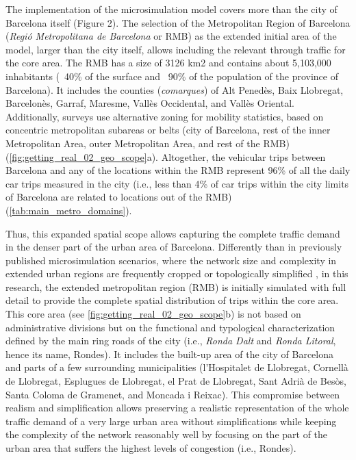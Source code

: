The implementation of the microsimulation model covers more than the city of Barcelona itself (Figure 2). The selection of the Metropolitan Region of Barcelona (\emph{Regió Metropolitana de Barcelona} or RMB) as the extended initial area of the model, larger than the city itself, allows including the relevant through traffic for the core area. The RMB has a size of 3126 km2 and contains about 5,103,000 inhabitants (~40\% of the surface and ~90\% of the population of the province of Barcelona). It includes the counties (\emph{comarques}) of Alt Penedès, Baix Llobregat, Barcelonès, Garraf, Maresme, Vallès Occidental, and Vallès Oriental. Additionally, surveys use alternative zoning for mobility statistics, based on concentric metropolitan subareas or belts (city of Barcelona, rest of the inner Metropolitan Area, outer Metropolitan Area, and rest of the RMB) (\autoref{fig:getting_real_02_geo_scope}a). Altogether, the vehicular trips between Barcelona and any of the locations within the RMB represent 96\% of all the daily car trips measured in the city (i.e., less than 4\% of car trips within the city limits of Barcelona are related to locations out of the RMB) \citep{InstitutdEstudisRegionalsiMetropolitansdeBarcelonaIERMB2020} (\autoref{tab:main_metro_domains}).

Thus, this expanded spatial scope allows capturing the complete traffic demand in the denser part of the urban area of Barcelona. Differently than in previously published microsimulation scenarios, where the network size and complexity in extended urban regions are frequently cropped or topologically simplified \citep{Tilg2020,Schweizer2021}, in this research, the extended metropolitan region (RMB) is initially simulated with full detail to provide the complete spatial distribution of trips within the core area. This core area (see \autoref{fig:getting_real_02_geo_scope}b) is not based on administrative divisions but on the functional and typological characterization defined by the main ring roads of the city (i.e., \emph{Ronda Dalt} and \emph{Ronda Litoral}, hence its name, Rondes). It includes the built-up area of the city of Barcelona and parts of a few surrounding municipalities (l’Hospitalet de Llobregat, Cornellà de Llobregat, Esplugues de Llobregat, el Prat de Llobregat, Sant Adrià de Besòs, Santa Coloma de Gramenet, and Moncada i Reixac). This compromise between realism and simplification allows preserving a realistic representation of the whole traffic demand of a very large urban area without simplifications while keeping the complexity of the network reasonably well by focusing on the part of the urban area that suffers the highest levels of congestion (i.e., Rondes).

